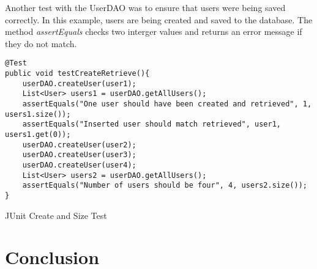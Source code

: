 Another test with the UserDAO was to ensure that users were being saved correctly. In this example, users are being created and saved to the database. The method \textit{assertEquals} checks two interger values and returns an error message if they do not match.

\begin{table}[H]
\begin{lstlisting}
@Test 
public void testCreateRetrieve(){
	userDAO.createUser(user1);
	List<User> users1 = userDAO.getAllUsers();
	assertEquals("One user should have been created and retrieved", 1, users1.size());
	assertEquals("Inserted user should match retrieved", user1, users1.get(0));
	userDAO.createUser(user2);
	userDAO.createUser(user3);
	userDAO.createUser(user4);
	List<User> users2 = userDAO.getAllUsers();
	assertEquals("Number of users should be four", 4, users2.size());
}
\end{lstlisting}
\caption{JUnit Create and Size Test}
\end{table}


\section{Conclusion}
